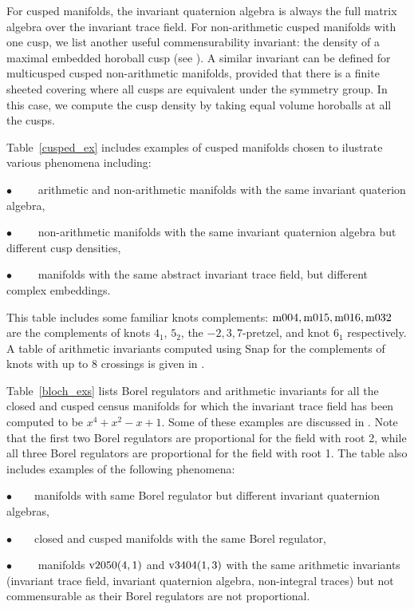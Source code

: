 \documentclass[a4paper]{amsart}
\theoremstyle{definition}
\begin{document}
For cusped manifolds, the invariant quaternion algebra is always the
full matrix algebra over the invariant trace field. 
For non-arithmetic cusped manifolds with one cusp, we list
another useful commensurability invariant: the density of a
maximal embedded horoball cusp (see \cite{nr2}).  
A similar invariant can be
defined for multicusped cusped non-arithmetic manifolds, provided
that there is a finite sheeted covering where all cusps are equivalent 
under the symmetry group. In this case, we compute the cusp density by taking
equal volume horoballs at all the cusps.

Table~\ref{cusped_ex} includes examples of cusped manifolds chosen
to ilustrate various phenomena including:

\noindent$\bullet$~~~~ arithmetic and non-arithmetic manifolds with the
same invariant quaterion algebra,

\noindent$\bullet$~~~~ non-arithmetic manifolds with the same 
invariant quaternion algebra but different cusp densities,

\noindent$\bullet$~~~~ manifolds with the same abstract invariant trace field, 
but different complex embeddings.

This table includes some familiar knots complements: 
$\hbox{m004}, \hbox{m015}, \hbox{m016}, \hbox{m032}$ are the 
complements of knots $4_1$, $5_2$, the $-2,3,7$-pretzel, and knot $6_1$
respectively. A table of arithmetic invariants computed using Snap 
for the complements of knots with up to 8 crossings is given in 
\cite{call-reid}.


Table~\ref{bloch_exs} lists Borel regulators and arithmetic 
invariants for all the closed and cusped census manifolds for which
the invariant trace field has been computed to be $x^4+x^2-x+1$.
Some of these examples are discussed in \cite{neumann-yang3}. Note that
the first two Borel regulators are proportional for the field with root 2,
while all three Borel regulators are proportional for the field with root 1.
The table also includes examples of the following phenomena:

\noindent$\bullet$~~~~manifolds with same Borel regulator 
but different invariant quaternion algebras,

\noindent$\bullet$~~~~closed and cusped manifolds with the same
Borel regulator,

\noindent$\bullet$~~~~ manifolds $\hbox{v2050}(4,1)$ and 
$\hbox{v3404}(1,3)$ with the
same arithmetic invariants (invariant trace field, 
invariant quaternion algebra, non-integral traces) but not commensurable
as their Borel regulators are not proportional.
\end{document}
